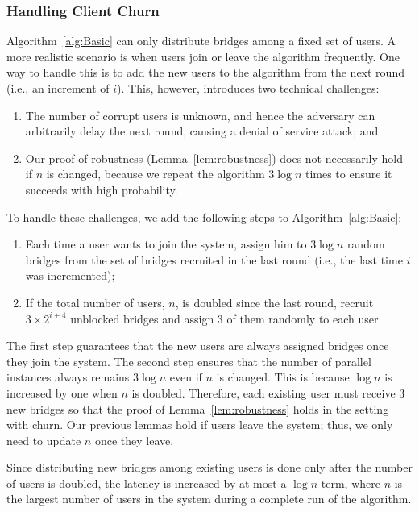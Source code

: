 \documentclass[a4paper,UKenglish]{lipics-v2016}
\newcommand{\ie}{i.e.}
\begin{document}
\subsubsection{Handling Client Churn} \label{sec:churn}
Algorithm~\ref{alg:Basic} can only distribute bridges among a fixed set of users. A more realistic scenario is when users join or leave the algorithm frequently. One way to handle this is to add the new users to the algorithm from the next round (\ie, an increment of $i$). This, however, introduces two technical challenges: 
\begin{enumerate}[itemsep=0.5em, topsep=0.6em]
	\item The number of corrupt users is unknown, and hence the adversary can arbitrarily delay the next round, causing a denial of service attack; and
	
	\item Our proof of robustness (Lemma~\ref{lem:robustness}) does not necessarily hold if $n$ is changed, because we repeat the algorithm $3\log{n}$ times to ensure it succeeds with high probability. 
\end{enumerate}

\noindent To handle these challenges, we	 add the following steps to Algorithm~\ref{alg:Basic}:

\begin{enumerate}[itemsep=0.5em, topsep=0.6em]
	\item Each time a user wants to join the system, assign him to $3\log{n}$ random bridges from the set of bridges recruited in the last round (\ie, the last time $i$ was incremented);
	
	\item If the total number of users, $n$, is doubled since the last round, recruit $3 \times 2^{i+4}$ unblocked bridges and assign $3$ of them randomly to each user.
\end{enumerate}

The first step guarantees that the new users are always assigned bridges once they join the system. The second step ensures that the number of parallel instances always remains $3\log{n}$ even if $n$ is changed. This is because $\log{n}$ is increased by one when $n$ is doubled. Therefore, each existing user must receive $3$ new bridges so that the proof of Lemma~\ref{lem:robustness} holds in the setting with churn. Our previous lemmas hold if users leave the system; thus, we only need to update $n$ once they leave.

Since distributing new bridges among existing users is done only after the number of users is doubled, the latency is increased by at most a $\log{n}$ term, where $n$ is the largest number of users in the system during a complete run of the algorithm.
\end{document}
